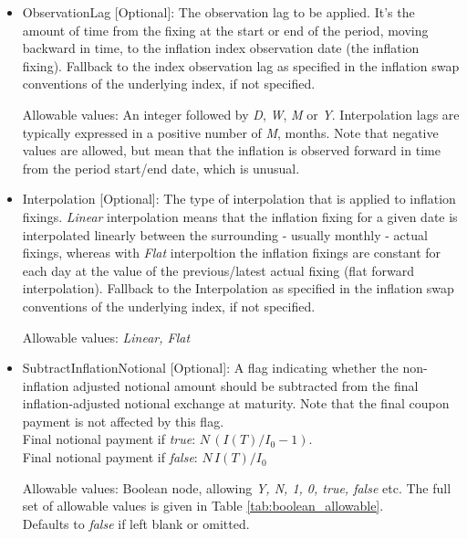 \begin{itemize}
Allowable values:  See \lstinline!Date! in Table \ref{tab:allow_stand_data}.

\item ObservationLag [Optional]: The observation lag to be applied. It's the amount of time from the fixing at the start or end of the period, moving backward in time, to the inflation index observation date (the inflation fixing). Fallback to the index observation lag as specified in the inflation swap conventions of the underlying index, if not specified.

Allowable values: An integer followed by \emph{D}, \emph{W}, \emph{M} or \emph{Y}. Interpolation lags are typically expressed in a positive number of  \emph{M}, months. Note that negative values are allowed, but mean that the inflation is observed forward in time from the period start/end date, which is unusual.

\item Interpolation [Optional]: The type of interpolation that is applied to inflation fixings. \emph{Linear} interpolation means that the inflation fixing for a given date is interpolated linearly between the surrounding - usually monthly - actual fixings, whereas with  \emph{Flat} interpoltion the inflation fixings are constant for each day at the value of the previous/latest actual fixing (flat forward interpolation).
Fallback to the Interpolation as specified in the inflation swap conventions of the underlying index, if not specified.

Allowable values:  \emph{Linear, Flat}

\item SubtractInflationNotional [Optional]: A flag indicating whether
  the non-inflation adjusted notional amount should be subtracted from
  the final inflation-adjusted notional exchange at maturity.
  Note that the final coupon payment is not affected by this flag. \\
Final notional payment if \emph{true}: $N \,(I(T)/I_0-1)$. \\
Final notional payment if  \emph{false}: $N \,I(T)/I_0$

Allowable values: Boolean node, allowing \emph{Y, N, 1, 0, true, false} etc. The full set of allowable values is given in Table \ref{tab:boolean_allowable}.
\\Defaults to \emph{false}  if left blank or omitted.


\end{itemize}
